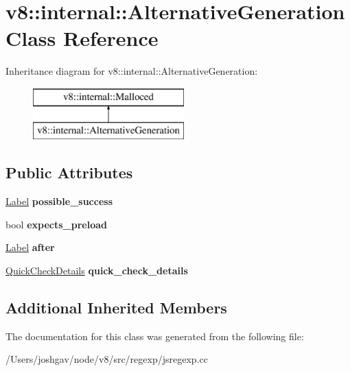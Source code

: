 \hypertarget{classv8_1_1internal_1_1_alternative_generation}{}\section{v8\+:\+:internal\+:\+:Alternative\+Generation Class Reference}
\label{classv8_1_1internal_1_1_alternative_generation}
Inheritance diagram for v8\+:\+:internal\+:\+:Alternative\+Generation\+:\begin{figure}[H]
\begin{center}
\leavevmode
\includegraphics[height=2.000000cm]{classv8_1_1internal_1_1_alternative_generation}
\end{center}
\end{figure}
\subsection*{Public Attributes}
\begin{DoxyCompactItemize}
\item 
\hyperlink{classv8_1_1internal_1_1_label}{Label} {\bfseries possible\+\_\+success}\hypertarget{classv8_1_1internal_1_1_alternative_generation_a6b2881c2cd1292cb0423fd4dab2ca823}{}\label{classv8_1_1internal_1_1_alternative_generation_a6b2881c2cd1292cb0423fd4dab2ca823}

\item 
bool {\bfseries expects\+\_\+preload}\hypertarget{classv8_1_1internal_1_1_alternative_generation_a71eb17f16f4e5201f9f251c9fe74a507}{}\label{classv8_1_1internal_1_1_alternative_generation_a71eb17f16f4e5201f9f251c9fe74a507}

\item 
\hyperlink{classv8_1_1internal_1_1_label}{Label} {\bfseries after}\hypertarget{classv8_1_1internal_1_1_alternative_generation_a5640bb3e3f745d0b4705cd21ae741361}{}\label{classv8_1_1internal_1_1_alternative_generation_a5640bb3e3f745d0b4705cd21ae741361}

\item 
\hyperlink{classv8_1_1internal_1_1_quick_check_details}{Quick\+Check\+Details} {\bfseries quick\+\_\+check\+\_\+details}\hypertarget{classv8_1_1internal_1_1_alternative_generation_a727fcad75b108bd5288f5771aae86831}{}\label{classv8_1_1internal_1_1_alternative_generation_a727fcad75b108bd5288f5771aae86831}

\end{DoxyCompactItemize}
\subsection*{Additional Inherited Members}


The documentation for this class was generated from the following file\+:\begin{DoxyCompactItemize}
\item 
/\+Users/joshgav/node/v8/src/regexp/jsregexp.\+cc\end{DoxyCompactItemize}
